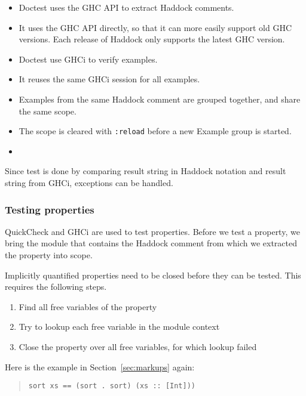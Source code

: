 \documentclass[preprint]{sigplanconf}
\begin{document}
\begin{itemize}
    \item
        Doctest uses the GHC API to extract Haddock comments.
    \item
        It uses the GHC API directly, so that it can more easily
        support old GHC versions.  Each release of Haddock only
        supports the latest GHC version.
    \item
        Doctest use GHCi to verify examples.
    \item
        It reuses the same GHCi session for all examples.
    \item
        Examples from the same Haddock comment are grouped together,
        and share the same scope.
    \item
        The scope is cleared with \verb|:reload| before a new
        Example group is started.
    \item
\end{itemize}

Since test is done by comparing result string in Haddock notation and
result string from GHCi, exceptions can be handled.

\subsubsection{Testing properties}

\noindent QuickCheck and GHCi are used to test properties.  Before we
test a property, we bring the module that contains the Haddock comment
from which we extracted the property into scope.

Implicitly quantified properties need to be closed before they can be
tested.  This requires the following steps.
\begin{enumerate}
    \item
        Find all free variables of the property
    \item
        Try to lookup each free variable in the module context
    \item
        Close the property over all free variables, for which lookup
        failed
\end{enumerate}

\noindent Here is the example in Section~\ref{sec:markups} again:

\begin{quote}\small\begin{verbatim}
sort xs == (sort . sort) (xs :: [Int]))
\end{verbatim}\end{quote}
\end{document}

